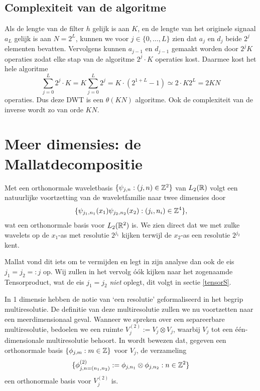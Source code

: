 \subsection{Complexiteit van de algoritme}
Als de lengte van de filter $h$ gelijk is aan $K$, en de lengte van het originele signaal $a_L$ 
gelijk is aan $N = 2^{L}$,
 kunnen we voor $j \in \{0, \ldots, L\}$ zien dat $a_j$ en $d_j$ beide $2^{j}$ elementen bevatten. 
Vervolgens kunnen $a_{j-1}$ en $d_{j-1}$ gemaakt worden door $2^{j}K$ operaties zodat elke stap van de algoritme 
$2^{j} \cdot K$ operaties kost. 
Daarmee kost het hele algoritme
\[
\sum_{j=0}^L 2^{j} \cdot K = K \sum_{j=0}^L 2^{j} = K \cdot (2^{1+L} - 1) \simeq 2 \cdot K 2^{L} = 2KN
\]
operaties. Dus deze DWT is een $\theta(KN)$ algoritme. 
Ook de complexiteit van de inverse wordt zo van orde $KN$.

\section{Meer dimensies: de Mallatdecompositie}
Met een orthonormale waveletbasis $\{ \psi_{j,n}: (j,n) \in \mathbb{Z}^2\}$ van $L_2(\mathbb{R})$ volgt een natuurlijke voortzetting
van de waveletfamilie naar twee dimensies door
\[
\{ \psi_{j_1,n_1}(x_1) \psi_{j_2,n_2}(x_2): (j_i,n_i) \in \mathbb{Z}^4 \},
\]
wat een orthonormale basis voor $L_2(\mathbb{R}^2)$ is. 
We zien direct dat we met zulke wavelets op de $x_1$-as met resolutie $2^{j_1}$ kijken 
terwijl de $x_2$-as een resolutie $2^{j_2}$ kent.

Mallat vond dit iets om te vermijden \cite[\S 7.7]{mallat} en legt in zijn analyse dan ook de eis $j_1 = j_2 =: j$ op. 
Wij zullen in het vervolg \'o\'ok kijken naar het zogenaamde Tensorproduct, wat de eis $j_1 = j_2$ \emph{niet} oplegt,
dit volgt in sectie \ref{tensorS}.

In 1 dimensie hebben de notie van `een resolutie' geformaliseerd in het begrip multiresolutie.
De definitie van deze multiresolutie zullen we nu voortzetten naar een meerdimensionaal geval. 
Wanneer we spreken over een separeerbare multiresolutie, bedoelen we een ruimte $V_j^{(2)} := V_j \otimes V_j$,
waarbij $V_j$ tot een \'e\'en-dimensionale multiresolutie behoort.
In \cite[A.5]{mallat} wordt bewezen dat, gegeven een orthonormale basis $\{ \phi_{j,m}: m \in \mathbb{Z} \}$ voor $V_j$, de verzameling
\begin{equation}
  \label{phi_phi_basis}
  \{ \phi^{(2)}_{j,n=(n_1,n_2)} := \phi_{j,n_1} \otimes \phi_{j,n_2}: n \in \mathbb{Z}^2 \}
\end{equation}
een orthonormale basis voor $V_j^{(2)}$ is.

